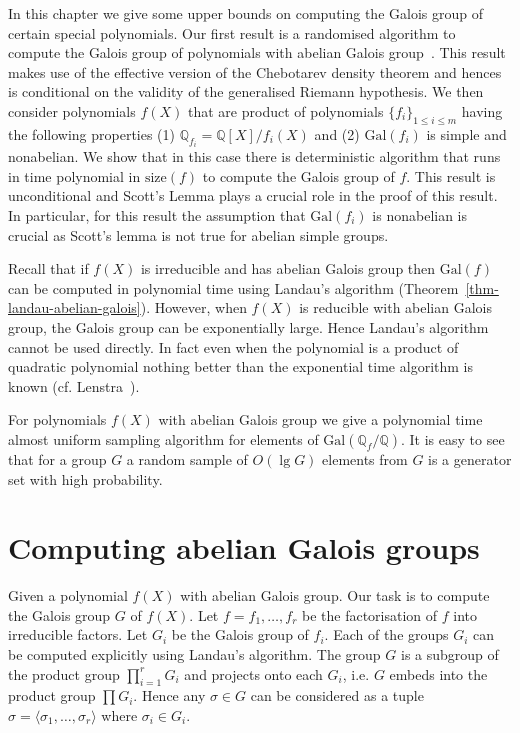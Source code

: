 \documentclass[11pt]{madras}%
\theoremstyle{remark}
\newcommand{\Gal}[1]{{\ensuremath{\mathrm{Gal}\left(#1\right)}}}
\newcommand{\size}[1]{{\ensuremath{\mathrm{size}\left(#1\right)}}}
\begin{document}
In this chapter we give some upper bounds on computing the Galois
group of certain special polynomials. Our first result is a randomised
algorithm to compute the Galois group of polynomials with abelian
Galois group~\cite{arvind2003galois}. This result makes use of the
effective version of the Chebotarev density theorem and hences is
conditional on the validity of the generalised Riemann hypothesis. We
then consider polynomials $f(X)$ that are product of polynomials $\{
f_i\}_{1 \leq i \leq m}$ having the following properties (1)
$\mathbb{Q}_{f_i} = \mathbb{Q}[X]/f_i(X)$ and (2) $\Gal{f_i}$ is
simple and nonabelian.  We show that in this case there is
deterministic algorithm that runs in time polynomial in $\size{f}$ to
compute the Galois group of $f$.  This result is unconditional and
Scott's Lemma plays a crucial role in the proof of this result. In
particular, for this result the assumption that $\Gal{f_i}$ is
nonabelian is crucial as Scott's lemma is not true for abelian simple
groups.

Recall that if $f(X)$ is irreducible and has abelian Galois group then
$\Gal{f}$ can be computed in polynomial time using Landau's algorithm
(Theorem~\ref{thm-landau-abelian-galois}).  However, when $f(X)$ is
reducible with abelian Galois group, the Galois group can be
exponentially large. Hence Landau's algorithm cannot be used directly.
In fact even when the polynomial is a product of quadratic polynomial
nothing better than the exponential time algorithm is known (cf.
Lenstra~\cite{lenstra92algorithm}).

For polynomials $f(X)$ with abelian Galois group we give a polynomial
time almost uniform sampling algorithm for elements of
$\Gal{\mathbb{Q}_f/\mathbb{Q}}$.  It is easy to see that for a group
$G$ a random sample of $O(\lg{G})$ elements from $G$ is a generator
set with high probability.

\section{Computing abelian Galois groups}

Given a polynomial $f(X)$ with abelian Galois group. Our task is to
compute the Galois group $G$ of $f(X)$.  Let $f = f_1,\ldots,f_r$ be
the factorisation of $f$ into irreducible factors.  Let $G_i$ be the
Galois group of $f_i$. Each of the groups $G_i$ can be computed
explicitly using Landau's algorithm. The group $G$ is a subgroup of
the product group $\prod_{i=1}^r G_i$ and projects onto each $G_i$,
i.e. $G$ embeds into the product group $\prod G_i$. Hence any $\sigma
\in G$ can be considered as a tuple $\sigma = \langle \sigma_1,
\ldots, \sigma_r\rangle$ where $\sigma_i \in G_i$.
\end{document}
